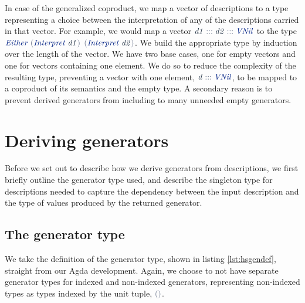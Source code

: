 \documentclass[a4paper,msc,twosized=semi]{uustthesis}
\newcommand*{\mathcolor}{}
\def\mathcolor#1#{\mathcoloraux{#1}}
\newcommand*{\mathcoloraux}[3]{%
  \protect\leavevmode
  \begingroup
    \color#1{#2}#3%
  \endgroup
}
\newcommand{\HSSpecial}[1]{\mathcolor{hsblue4}{#1}}
\newcommand{\HSSym}[1]{\mathcolor{hsblue4}{#1}}
\newcommand{\HSCon}[1]{\mathcolor{hsblue3}{\mathit{#1}}}
\newcommand{\HSVar}[1]{\mathcolor{hsblue5}{\mathit{#1}}}
\begin{document}
  In case of the generalized coproduct, we map a vector of descriptions to a type 
  representing a choice between the interpretation of any of the descriptions carried 
  in that vector. For example, we would map a vector \ensuremath{\HSVar{d1}\HSSym{:::}\HSVar{d2}\HSSym{:::}\HSCon{VNil}} to the type 
  \ensuremath{\HSCon{Either}\;\HSSpecial{(}\HSCon{Interpret}\;\HSVar{d1}\HSSpecial{)}} \ensuremath{\HSSpecial{(}\HSCon{Interpret}\;\HSVar{d2}\HSSpecial{)}}. We build the appropriate type by induction 
  over the length of the vector. We have two base cases, one for empty vectors and one 
  for vectors containing one element. We do so to reduce the complexity of the 
  resulting type, preventing a vector with one element, \ensuremath{\HSVar{d}\HSSym{:::}\HSCon{VNil}}, to be mapped to 
  a coproduct of its semantics and the empty type. A secondary reason is to 
  prevent derived generators from including to many unneeded empty generators. 

\section{Deriving generators}

  Before we set out to describe how we derive generators from descriptions, we first 
  briefly outline the generator type used, and describe the singleton type for 
  descriptions needed to capture the dependency between the input description and the 
  type of values produced by the returned generator. 

\subsection{The generator type}

  We take the definition of the generator type, shown in listing \ref{lst:hsgendef}, 
  straight from our Agda development. Again, we choose to not have separate generator 
  types for indexed and non-indexed generators, representing non-indexed types as 
  types indexed by the unit tuple, \ensuremath{\HSSpecial{(}\HSSpecial{)}}. 
\end{document}
